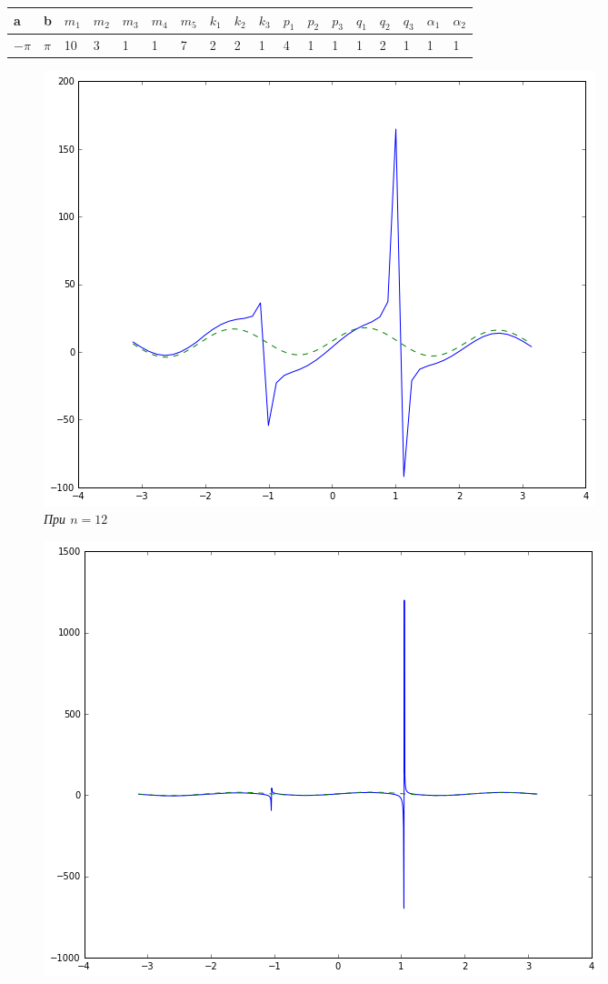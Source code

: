 \begin{figure}[h!]
\begin{center}
    \begin{tabular}{| l | l | l | l | l | l | l | l | l | l | l | l | l | l | l | l | l | l |}
	\hline
	a & b & $m_1$ & $m_2$ & $m_3$ & $m_4$ & $m_5$ & $k_1$ & $k_2$ & $k_3$ & $p_1$ & $p_2$ & $p_3$ & $q_1$ & $q_2$ & $q_3$ & $\alpha_1$ & $\alpha_2$ \\\hline
	$-\pi$ & $\pi$ & 10 & 3 & 1 & 1 & 7 & 2 & 2 & 1 & 4 & 1 & 1 & 1 & 2 & 1 & 1 & 1\\ \hline
    \end{tabular}
\end{center}
\bigskip
\centering
\begin{subfigure}{.5\textwidth}
  \centering
  \includegraphics[width=.95\linewidth]{res2_n50}
  \caption{\it При \(n = 12\)}
  \label{fig:sub1}
\end{subfigure}%
\begin{subfigure}{.5\textwidth}
  \centering
  \includegraphics[width=.95\linewidth]{res2_n1500}

\end{subfigure}
\end{figure}
